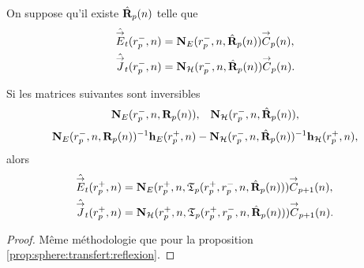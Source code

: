     \begin{prop}%
      \label{prop:sphere:relevement:reflexion}
      On suppose qu'il existe \(\hat{\mathbf{R}}_{p}(n)\) telle que 
      \begin{align*}
        \hat{{\overset{\rightarrow}{E}}}_t(r_{p}^-,n) &= \mathbf{N}_{E}(r_p^-,n,\hat{\mathbf{R}}_{p}(n)){\overset{\rightarrow}{C}}_{p}(n),
        \\
        \hat{{\overset{\rightarrow}{J}}}_t(r_{p}^-,n) &= \mathbf{N}_{\mathcal{H}}(r_p^-,n,\hat{\mathbf{R}}_{p}(n)){\overset{\rightarrow}{C}}_{p}(n).
      \end{align*}

      Si les matrices suivantes sont inversibles
      \begin{align*}
        \mathbf{N}_{E}(r_p^-,n,\mathbf{R}_{p}(n)), && \mathbf{N}_{\mathcal{H}}(r_p^-,n,\hat{\mathbf{R}}_{p}(n)),
      \end{align*}
      \begin{align*}
        \mathbf{N}_{E}(r_p^-,n,\mathbf{R}_{p}(n))^{-1}\mathbf{h}_{E}(r_p^+,n) - \mathbf{N}_{\mathcal{H}}(r_p^-,n,\hat{\mathbf{R}}_{p}(n))^{-1}\mathbf{h}_{\mathcal{H}}(r_p^+,n),
      \end{align*}
      alors
      \begin{align*}
        \hat{{\overset{\rightarrow}{E}}}_t(r_{p}^+,n) &= \mathbf{N}_{E}(r_p^+,n,\mathfrak{T}_p(r_p^+,r_p^-,n,\hat{\mathbf{R}}_{p}(n))){\overset{\rightarrow}{C}}_{p+1}(n),
        \\
        \hat{{\overset{\rightarrow}{J}}}_t(r_{p}^+,n) &= \mathbf{N}_{\mathcal{H}}(r_p^+,n,\mathfrak{T}_p(r_p^+,r_p^-,n,\hat{\mathbf{R}}_{p}(n))){\overset{\rightarrow}{C}}_{p+1}(n).
      \end{align*}
    \end{prop}

    \begin{proof}
      Même méthodologie que pour la proposition \ref{prop:sphere:transfert:reflexion}.
    \end{proof}

